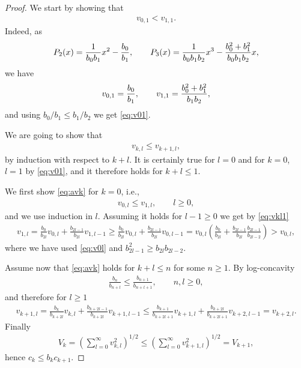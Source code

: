 \documentclass[pdftex]{sigma}
\numberwithin{equation}{section}
\begin{document}
 \begin{proof} We start by showing that
\begin{gather}\label{eq:v01}
v_{0,1} < v_{1,1}.
\end{gather}
Indeed, as
\begin{gather*}
P_2(x)={1\over b_0b_1}x^2-{b_0\over b_1},\qquad P_3(x)={1\over b_0b_1b_2}x^3-{b_0^2+b_1^2\over b_0b_1b_2}x,
\end{gather*}
 we have{\samepage
 \begin{gather*}
v_{0,1}= {b_0\over b_1},\qquad v_{1,1}={b_0^2+b_1^2\over b_1 b_2},
\end{gather*}
and using $b_0/b_1\le b_1/b_2$ we get \eqref{eq:v01}.}

 We are going to show that
 \begin{gather}\label{eq:avk}
v_{k,l}\le v_{k+1,l},
 \end{gather}
 by induction with respect to $k+l$. It is certainly true for $l=0$ and for $k=0$, $l=1$ by \eqref{eq:v01}, and it therefore holds for $k+l\le 1$.

We first show \eqref{eq:avk} for $k=0$, i.e.,
\begin{gather*}
v_{0,l}\le v_{1,l},\qquad l\ge 0,
\end{gather*}
and we use induction in $l$. Assuming it holds for $l-1\ge 0$ we get by \eqref{eq:vkl1}
\begin{gather*}
v_{1,l} = \frac{b_0}{b_{2l}}v_{0,l}+\frac{b_{2l-1}}{b_{2l}}v_{1,l-1} \ge \frac{b_0}{b_{2l}}v_{0,l}+\frac{b_{2l-1}}{b_{2l}}v_{0,l-1}
= v_{0,l}\left(\frac{b_0}{b_{2l}}+\frac{b_{2l-1}}{b_{2l}}\frac{b_{2l-1}}{b_{2l-2}} \right)> v_{0,l},
\end{gather*}
where we have used \eqref{eq:v0l} and $b_{2l-1}^2\ge b_{2l}b_{2l-2}$.

Assume now that \eqref{eq:avk} holds for $k+l\le n$ for some $n\ge 1$. By log-concavity
\begin{gather*}
\frac{b_n}{b_{n+l}}\le\frac{b_{n+1}}{b_{n+l+1}},\qquad n,l\ge 0,
\end{gather*}
and therefore for $l\ge 1$
\begin{gather*}
 v_{k+1,l} = \frac{b_{k}}{b_{k+2l}} v_{k,l}+ \frac{b_{k+2l-1}}{b_{k+2l}} v_{k+1,l-1} \le \frac{b_{k+1}}{b_{k+2l+1}}v_{k+1,l}+ \frac{b_{k+2l}}{b_{k+2l+1}}v_{k+2,l-1} =v_{k+2,l}.
\end{gather*}
 Finally
\begin{gather*}
V_k=\left(\sum_{l=0}^\infty v_{k,l}^2\right)^{1/2} \le \left(\sum_{l=0}^\infty v_{k+1,l}^2\right)^{1/2}=V_{k+1},
\end{gather*}
hence $c_k\le b_kc_{k+1}$.
 \end{proof}
\end{document}
